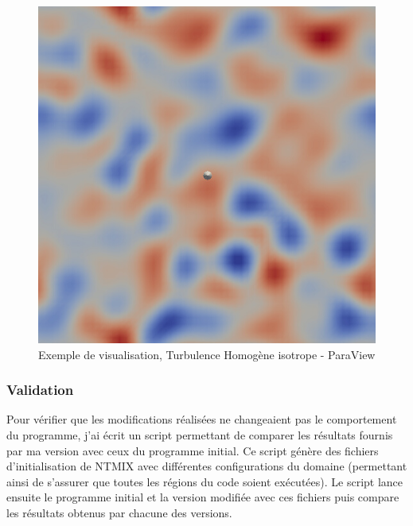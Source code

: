 \begin{figure}[!ht]
  \centering
  \includegraphics[scale=0.3]{figures/thi-example.png}
  \caption{\label{fig:visu}Exemple de visualisation, Turbulence Homogène isotrope - ParaView}
\end{figure}



\subsubsection{Validation}
Pour vérifier que les modifications réalisées ne changeaient pas le comportement du programme, j'ai écrit un script permettant de comparer les résultats fournis par ma version avec ceux du programme initial. Ce script génère des fichiers d'initialisation de NTMIX avec différentes configurations du domaine (permettant ainsi de s'assurer que toutes les régions du code soient exécutées). Le script lance ensuite le programme initial et la version modifiée avec ces fichiers puis compare les résultats obtenus par chacune des versions.


